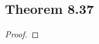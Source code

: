 \documentclass[../../main.tex]{subfiles}
\begin{document}
\subsection{Theorem 8.37}
\begin{wts}

\end{wts}
\begin{proof}

\end{proof}
\end{document}
